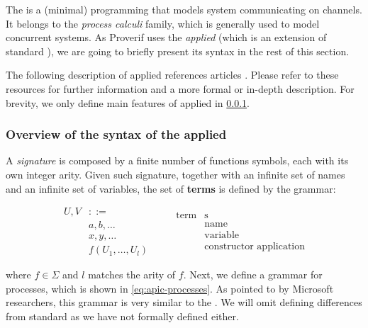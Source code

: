 The \pic \cite{pi-calculus-book} is a (minimal) programming that models system communicating on channels. It belongs to the \textit{process calculi} family, which is generally used to model concurrent systems. As Proverif uses the \textit{applied} \pic (which is an extension of standard \picnospace), we are going to briefly present its syntax in the rest of this section.

The following description of applied \pic references articles \cite{applied-pi-calculus-private-auth, applied-pi-calculus-abadi-1, applied-pi-calculus-abadi-2}. Please refer to these resources for further information and a more formal or in-depth description. For brevity, we only define main features of applied \pic in \cref{subsub:syntax-apic}.

\subsubsection{Overview of the syntax of the applied \pic}
\label{subsub:syntax-apic}

A \textit{signature \textSigma} is composed by a finite number of functions symbols, each with its own integer arity. Given such signature, together with an infinite set of names and an infinite set of variables, the set of \textbf{terms} is defined by the grammar:

\begin{equation}
    \label{eq:apic-terms}
    \begin{aligned}
        U, V & ::=                           \\
             & a, b, \dots                   \\
             & x, y, \dots                   \\
             & f\left(U_1, \dots, U_l\right)
    \end{aligned}
    \qquad
    \begin{aligned}
        \mbox{term} & \mbox{s}                       \\
                    & \mbox{name}                    \\
                    & \mbox{variable}                \\
                    & \mbox{constructor application}
    \end{aligned}
\end{equation}

where $f \in \Sigma$ and $l$ matches the arity of $f$. Next, we define a grammar for processes, which is shown in \cref{eq:apic-processes}. As pointed to by Microsoft researchers, this grammar is very similar to the \pic \cite{applied-pi-calculus-private-auth}. We will omit defining differences from standard \pic as we have not formally defined \pic either.

